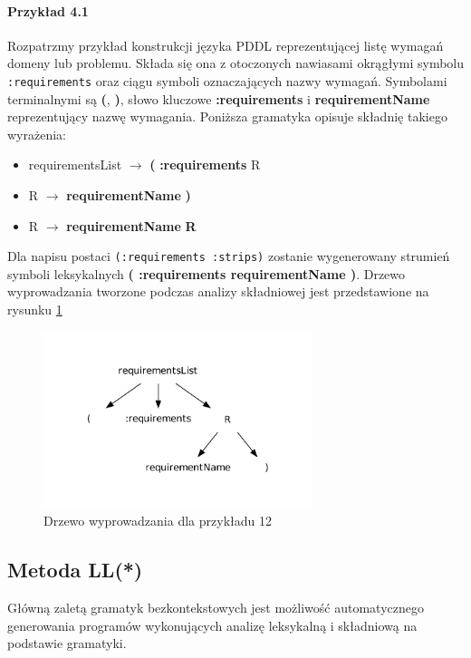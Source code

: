 \paragraph{Przykład 4.1}
Rozpatrzmy przykład konstrukcji języka PDDL reprezentującej listę wymagań domeny lub problemu.
Składa się ona z otoczonych nawiasami okrągłymi symbolu \texttt{:requirements} oraz
ciągu symboli oznaczających nazwy wymagań. Symbolami terminalnymi są 
\textbf{(}, \textbf{)}, słowo kluczowe \textbf{:requirements} i 
\textbf{requirementName} reprezentujący nazwę wymagania. Poniższa gramatyka opisuje
składnię takiego wyrażenia:

\begin{itemize}
\item requirementsList $\rightarrow$ \textbf{(} \textbf{:requirements} R
\item R $\rightarrow$ \textbf{requirementName} \textbf{)}
\item R $\rightarrow$ \textbf{requirementName} \textbf{R}
\end{itemize}

Dla napisu postaci \texttt{(:requirements :strips)} zostanie
wygenerowany strumień symboli leksykalnych \textbf{( :requirements requirementName )}.
Drzewo wyprowadzania tworzone podczas analizy składniowej jest przedstawione 
na rysunku \ref{antlr_example}

\begin{figure}[h!]
  \centering
    \includegraphics[width=0.7\textwidth]{img/antlr_example.pdf}
    \caption{Drzewo wyprowadzania dla przykładu 12}
    \label{antlr_example}
\end{figure}

\subsection{Metoda LL(*)}
Główną zaletą gramatyk bezkontekstowych jest możliwość automatycznego generowania programów
wykonujących analizę leksykalną i składniową na podstawie gramatyki.


